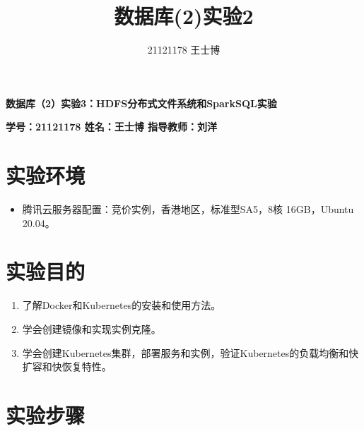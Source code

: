 \documentclass{article}
\title{\Huge 数据库(2)实验2}
\author{21121178 王士博}
\begin{document}
\begin{center}
    \textbf{\huge 数据库（2）实验3：HDFS分布式文件系统和SparkSQL实验}
\end{center}
\begin{center}
    \textbf{\large \textbf{学号：21121178 \quad 姓名：王士博 \quad 指导教师：刘洋}}
\end{center}
\hrulefill
\section{实验环境}
\begin{itemize}
    \item 腾讯云服务器配置：竞价实例，香港地区，标准型SA5，8核 16GB，Ubuntu 20.04。
\end{itemize}
\section{实验目的}
\begin{enumerate}
    \item 了解Docker和Kubernetes的安装和使用方法。
    \item 学会创建镜像和实现实例克隆。
    \item 学会创建Kubernetes集群，部署服务和实例，验证Kubernetes的负载均衡和快扩容和快恢复特性。
\end{enumerate}
\section{实验步骤}
\end{document}
